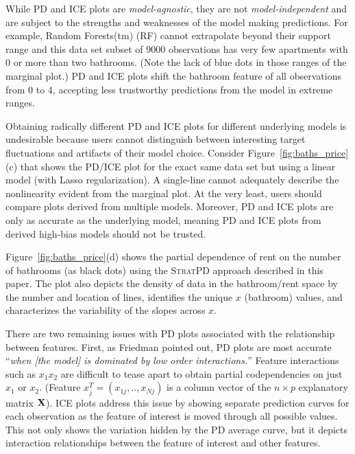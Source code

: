 \documentclass[12pt]{article}
\newcommand{\figref}[1]{Figure~\ref{#1}}
\newcommand{\cut}[1]{}
\newcommand{\spd}{\fontfamily{cmr}\textsc{\small StratPD}}
\begin{document}
\cut{The partial dependence plot broadly follows the marginal plot except for the prices of two and three bathroom apartments, where it levels off. This is counterintuitive and exposes an issue with PD and ICE plots.} While PD and ICE plots are {\em model-agnostic}, they are not {\em model-independent} and are subject to the strengths and weaknesses of the model making predictions.  For example, Random Forests(tm) (RF) cannot extrapolate beyond their support range and this data set subset of 9000 observations has very few apartments with 0 or more than two bathrooms.  (Note the lack of blue dots in those ranges of the marginal plot.) PD and ICE plots shift the bathroom feature of all observations from 0 to 4, accepting less trustworthy predictions from the model in extreme ranges.   

Obtaining radically different PD and ICE plots for different underlying models is undesirable because users cannot distinguish between interesting target fluctuations and artifacts of their model choice. Consider \figref{fig:baths_price}(c) that shows the PD/ICE plot for the exact same data set but using a linear model (with Lasso regularization). A single-line cannot adequately describe the nonlinearity evident from the marginal plot. At the very least, users should compare plots derived from multiple models. Moreover, PD and ICE plots are only as accurate as the underlying model, meaning PD and ICE plots from derived high-bias models should not be trusted.

\figref{fig:baths_price}(d) shows the partial dependence of rent on the number of bathrooms (as black dots) using the \spd{} approach described in this paper. The plot also depicts the density of data in the bathroom/rent space by the number and location of lines, identifies the unique $x$ (bathroom) values, and characterizes the variability of the slopes across $x$.

There are two remaining issues with PD plots associated with the relationship between features. First, as Friedman pointed out, PD plots are most accurate ``{\em when {\em [the model]} is dominated by low order interactions.}''  Feature interactions such as $x_1x_2$ are difficult to tease apart to obtain partial codependencies on just $x_1$ or $x_2$. (Feature $x_j^T = (x_{1j}, .., x_{Nj})$ is a column vector of the  $n \times p$ explanatory matrix ${\bf X}$). ICE plots address this issue by showing separate prediction curves for each observation as the feature of interest is moved through all possible values.  This not only shows the variation hidden by the PD average curve, but it depicts interaction relationships between the feature of interest and other features.
\end{document}
